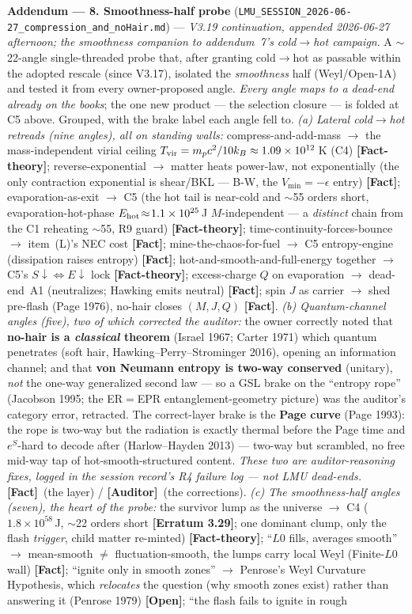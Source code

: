 \documentclass[11pt]{article}
\newcommand{\Fact}{\textbf{\textcolor{green!45!black}{[Fact]}}}
\newcommand{\Open}{\textbf{\textcolor{gray!10!black}{[Open]}}}
\newcommand{\Auditor}{\textbf{\textcolor{teal!55!black}{[Auditor]}}}
\newcommand{\factth}{\textcolor{green!40!black}{\textbf{[Fact-theory]}}}
\begin{document}
\smallskip\noindent\textbf{Addendum --- 8. Smoothness-half probe} (\texttt{LMU\_SESSION\_2026-06-27\_compression\_and\_noHair.md}) --- \emph{V3.19 continuation, appended 2026-06-27 afternoon; the smoothness companion to addendum~7's cold$\to$hot campaign}. A $\sim$22-angle single-threaded probe that, after granting cold$\to$hot as passable within the adopted rescale (since V3.17), isolated the \emph{smoothness} half (Weyl/Open-1A) and tested it from every owner-proposed angle. \emph{Every angle maps to a dead-end already on the books}; the one new product --- the selection closure --- is folded at C5 above. Grouped, with the brake label each angle fell to. \emph{(a) Lateral cold$\to$hot retreads (nine angles), all on standing walls:} compress-and-add-mass $\to$ the mass-independent virial ceiling $T_{\rm vir}=m_pc^2/10k_B\approx1.09\times10^{12}$\,K (C4) \factth; reverse-exponential $\to$ matter heats power-law, not exponentially (the only contraction exponential is shear/BKL --- B-W, the $V_{\min}=-\epsilon$ entry) \Fact; evaporation-as-exit $\to$ C5 (the hot tail is near-cold and $\sim$55 orders short, evaporation-hot-phase $E_{\rm hot}\!\approx\!1.1\times10^{25}$\,J $M$-independent --- a \emph{distinct} chain from the C1 reheating $\sim$55, R9 guard) \factth; time-continuity-forces-bounce $\to$ item~(L)'s NEC cost \Fact; mine-the-chaos-for-fuel $\to$ C5 entropy-engine (dissipation raises entropy) \Fact; hot-and-smooth-and-full-energy together $\to$ C5's $S\!\downarrow\!\Leftrightarrow\!E\!\downarrow$ lock \factth; excess-charge $Q$ on evaporation $\to$ dead-end~A1 (neutralizes; Hawking emits neutral) \Fact; spin $J$ as carrier $\to$ shed pre-flash (Page 1976), no-hair closes $(M,J,Q)$ \Fact. \emph{(b) Quantum-channel angles (five), two of which corrected the auditor:} the owner correctly noted that \textbf{no-hair is a \emph{classical} theorem} (Israel 1967; Carter 1971) which quantum penetrates (soft hair, Hawking--Perry--Strominger 2016), opening an information channel; and that \textbf{von Neumann entropy is two-way conserved} (unitary), \emph{not} the one-way generalized second law --- so a GSL brake on the ``entropy rope'' (Jacobson 1995; the ER$=$EPR entanglement-geometry picture) was the auditor's category error, retracted. The correct-layer brake is the \textbf{Page curve} (Page 1993): the rope is two-way but the radiation is exactly thermal before the Page time and $e^{S}$-hard to decode after (Harlow--Hayden 2013) --- two-way but scrambled, no free mid-way tap of hot-smooth-structured content. \emph{These two are auditor-reasoning fixes, logged in the session record's R4 failure log --- not LMU dead-ends.} \Fact\ (the layer) / \Auditor\ (the corrections). \emph{(c) The smoothness-half angles (seven), the heart of the probe:} the survivor lump as the universe $\to$ C4 ($1.8\times10^{58}$\,J, $\sim$22 orders short \textbf{[Erratum 3.29]}; one dominant clump, only the flash \emph{trigger}, child matter re-minted) \factth; ``$L0$ fills, averages smooth'' $\to$ mean-smooth $\ne$ fluctuation-smooth, the lumps carry local Weyl (Finite-$L0$ wall) \Fact; ``ignite only in smooth zones'' $\to$ Penrose's Weyl Curvature Hypothesis, which \emph{relocates} the question (why smooth zones exist) rather than answering it (Penrose 1979) \Open; ``the flash fails to ignite in rough 
\end{document}
